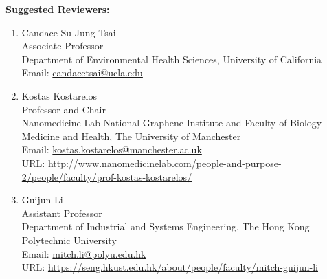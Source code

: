 \documentclass[11pt]{letter}
\begin{document}
\newpage
\textbf{Suggested Reviewers:}
\begin{enumerate}

\item Candace Su-Jung Tsai \\
Associate Professor \\
Department of Environmental Health Sciences, University of California\\
Email: \href{mailto:candacetsai@ucla.edu}{candacetsai@ucla.edu}\\



\item Kostas Kostarelos\\
Professor and Chair\\
Nanomedicine Lab National Graphene Institute and Faculty of Biology Medicine and Health, The University of Manchester\\
Email: \href{mailto:kostas.kostarelos@manchester.ac.uk}{kostas.kostarelos@manchester.ac.uk}\\
URL: \url{http://www.nanomedicinelab.com/people-and-purpose-2/people/faculty/prof-kostas-kostarelos/}\\

\item Guijun Li\\
Assistant Professor\\
Department of Industrial and Systems Engineering, The Hong Kong Polytechnic University\\
Email: \href{mailto:mitch.li@polyu.edu.hk}{mitch.li@polyu.edu.hk}\\
URL: \url{https://seng.hkust.edu.hk/about/people/faculty/mitch-guijun-li}\\



\end{enumerate}
\end{document}
